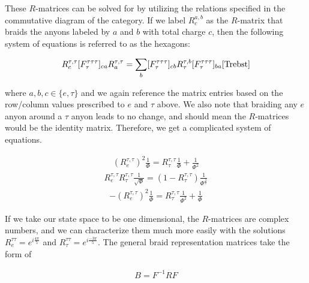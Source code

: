 These $R$-matrices can be solved for by utilizing the relations specified in the commutative diagram of the category. If we label $R^{a,b}_c$ as the $R$-matrix that braids the anyons labeled by $a$ and $b$ with total charge $c$, then the following system of equations is referred to as the hexagons:

\begin{equation}
	\begin{aligned}
		R^{\tau,\tau}_c [F^{\tau\tau\tau}_\tau]_{ca}R^{\tau,\tau}_a = \sum_b [F^{\tau\tau\tau}_\tau]_{cb}R^{\tau,b}_\tau[F^{\tau\tau\tau}_\tau]_{ba} \cite{Trebst}
	\end{aligned}
\end{equation}

where $a,b,c\in\{e,\tau\}$ and we again reference the matrix entries based on the row/column values prescribed to $e$ and $\tau$ above. We also note that braiding any $e$ anyon around a $\tau$ anyon leads to no change, and should mean the $R$-matrices would be the identity matrix. Therefore, we get a complicated system of equations.

\begin{equation}
	\begin{aligned}
		(R^{\tau,\tau}_e)^2\frac{1}{\Phi} = R^{\tau,\tau}_\tau\frac{1}{\Phi} + \frac{1}{\Phi^2}
	\end{aligned}
\end{equation}
\begin{equation}
	\begin{aligned}
		R^{\tau,\tau}_eR^{\tau,\tau}_\tau\frac{1}{\sqrt{\Phi}} = (1-R^{\tau,\tau}_\tau)\frac{1}{\Phi^\frac{3}{2}} 
	\end{aligned}
\end{equation}
\begin{equation}
	\begin{aligned}
		-(R^{\tau,\tau}_e)^2\frac{1}{\Phi} = R^{\tau,\tau}_\tau\frac{1}{\Phi^2}+\frac{1}{\Phi}
	\end{aligned}
\end{equation}

If we take our state space to be one dimensional, the $R$-matrices are complex numbers, and we can characterize them much more easily with the solutions $R^{\tau\tau}_e = e^{i\frac{4\pi}{5}}$ and $R^{\tau\tau}_\tau = e^{i\frac{-3\pi}{5}}$. The general braid representation matrices take the form of 

\begin{equation}
	\begin{aligned}
		B = F^{-1}R F
	\end{aligned}
\end{equation}

